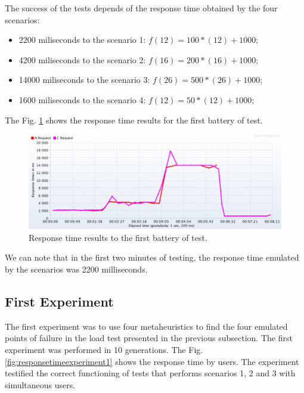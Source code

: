 \documentclass[review]{elsarticle}
\begin{document}
The success of the tests depends of the response time obtained by  the four scenarios:

\begin{itemize}
\item 2200 miliseconds to the scenario 1: $f(12)=100*(12)+1000$;
\item 4200 miliseconds to the scenario 2: $f(16)=200*(16)+1000$;
\item 14000 miliseconds to the scenario 3: $f(26)=500*(26)+1000$;
\item 1600 miliseconds to the scenario 4:
$f(12)=50*(12)+1000$;
\end{itemize}

The Fig. \ref{fig:responsetimetest1} shows the response time results for the first battery of test.

\begin{figure}[H]
\centering
\includegraphics[width=1\textwidth]{./images/responsetimetest1.png}
\caption{Response time results to the first battery of test.}
\label{fig:responsetimetest1}
\end{figure}

We can note that in the first two minutes of testing, the response time emulated by the scenarios was 2200 milliseconds.

\subsection{First Experiment}

The first experiment was to use four metaheuristics to find the four emulated points of failure in the load test presented in the previous subsection. The first experiment was performed in 10 generations. The Fig. \ref{fig:responsetimeexperiment1} shows the response time by users. The experiment testified the correct functioning of tests that performs  scenarios 1, 2 and 3 with simultaneous users.
\end{document}
